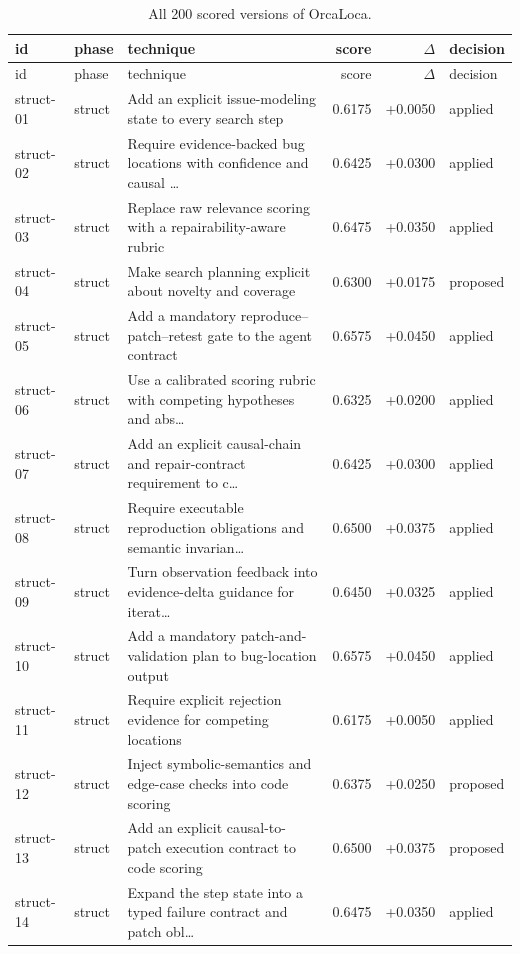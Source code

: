 \begin{center}\scriptsize\begin{longtable}{llp{5.2cm}rrl}
\caption{All 200 scored versions of OrcaLoca.}\\
\toprule id & phase & technique & score & $\Delta$ & decision \\ \midrule \endfirsthead
\toprule id & phase & technique & score & $\Delta$ & decision \\ \midrule \endhead
struct-01 & struct & Add an explicit issue-modeling state to every search step & 0.6175 & +0.0050 & applied \\
struct-02 & struct & Require evidence-backed bug locations with confidence and causal \ldots{} & 0.6425 & +0.0300 & applied \\
struct-03 & struct & Replace raw relevance scoring with a repairability-aware rubric & 0.6475 & +0.0350 & applied \\
struct-04 & struct & Make search planning explicit about novelty and coverage & 0.6300 & +0.0175 & proposed \\
struct-05 & struct & Add a mandatory reproduce–patch–retest gate to the agent contract & 0.6575 & +0.0450 & applied \\
struct-06 & struct & Use a calibrated scoring rubric with competing hypotheses and abs\ldots{} & 0.6325 & +0.0200 & applied \\
struct-07 & struct & Add an explicit causal-chain and repair-contract requirement to c\ldots{} & 0.6425 & +0.0300 & applied \\
struct-08 & struct & Require executable reproduction obligations and semantic invarian\ldots{} & 0.6500 & +0.0375 & applied \\
struct-09 & struct & Turn observation feedback into evidence-delta guidance for iterat\ldots{} & 0.6450 & +0.0325 & applied \\
struct-10 & struct & Add a mandatory patch-and-validation plan to bug-location output & 0.6575 & +0.0450 & applied \\
struct-11 & struct & Require explicit rejection evidence for competing locations & 0.6175 & +0.0050 & applied \\
struct-12 & struct & Inject symbolic-semantics and edge-case checks into code scoring & 0.6375 & +0.0250 & proposed \\
struct-13 & struct & Add an explicit causal-to-patch execution contract to code scoring & 0.6500 & +0.0375 & proposed \\
struct-14 & struct & Expand the step state into a typed failure contract and patch obl\ldots{} & 0.6475 & +0.0350 & applied \\

\end{longtable}
\end{center}
